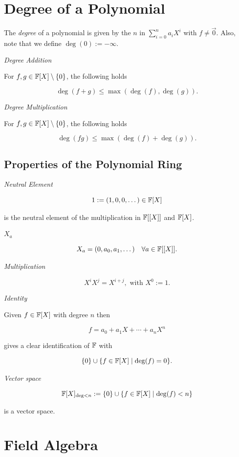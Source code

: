 \section{Degree of a Polynomial}

The \emph{degree} of a polynomial is given by the \(n\) in \(\sum_{i = 0}^{n} a_i X^i\) with \(f \ne \vec{0}\).
Also, note that we define \(\deg(0):= -\infty\).

\emph{Degree Addition}

For \(f,g \in \mathbb{F}[X] \setminus \{0\}\), the following holds

\[
	\deg(f + g) \le \max(\deg(f),\deg(g)).
\]

\emph{Degree Multiplication}

For \(f,g \in \mathbb{F}[X] \setminus \{0\}\), the following holds

\[
	\deg(fg) \le \max(\deg(f) + \deg(g)).
\]

\subsection{Properties of the Polynomial Ring}

\emph{Neutral Element}

\[
	1 := (1, 0, 0, \dots) \in \mathbb{F}[X]
\]

is the neutral element of the multiplication in \(\mathbb{F}[[X]]\) and \(\mathbb{F}[X]\).

\emph{\(X_a\)}

\[
	X_a = (0, a_0, a_1, \dots) \quad \forall a \in \mathbb{F} [[X]].
\]

\emph{Multiplication}

\[
	X^i X^j = X^{i + j}, \text{ with } X^0 := 1.
\]

\emph{Identity}

Given \(f \in \mathbb{F}[X]\) with degree \(n\) then

\[
	f = a_0 + a_1 X + \cdots + a_n X^n
\]

gives a clear identification of \(\mathbb{F}\) with

\[
	\{0\} \cup \{f \in \mathbb{F} [X] \mid \deg(f) = 0\}.
\]

\emph{Vector space}

\[
	\mathbb{F}[X]_{\deg < n} := \{0\} \cup \{f \in \mathbb{F} [X] \mid \deg(f) < n\}
\]

is a vector space.


\section{Field Algebra}

